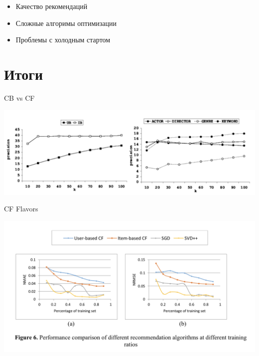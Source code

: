 \documentclass[11pt,aspectratio=169]{beamer}
\begin{document}
\begin{frame}{}

\begin{tcolorbox}[colback=info!5,colframe=info!80,title=Плюсы]
  \begin{itemize}
    \item Качество рекомендаций
  \end{itemize}
\end{tcolorbox}

\begin{tcolorbox}[colback=warn!5,colframe=warn!80,title=Минусы]
  \begin{itemize}
    \item Сложные алгоримы оптимизации
    \item Проблемы с холодным стартом
  \end{itemize}
\end{tcolorbox}

\end{frame}

\section{Итоги}

\begin{frame}{CB vs CF}

\begin{center}
\includegraphics[scale=0.5]{images/comparison2.png}
\end{center}

\end{frame}

\begin{frame}{CF Flavors}

\begin{center}
\includegraphics[scale=0.5]{images/comparison.png}
\end{center}

\end{frame}
\end{document}
